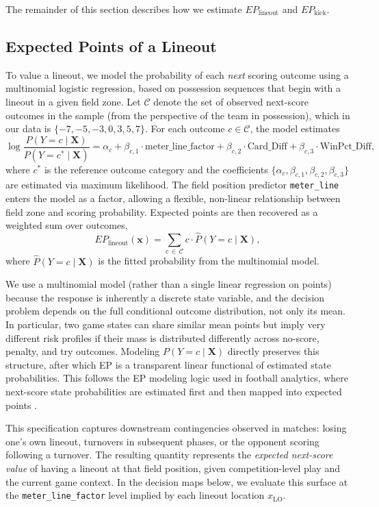 \documentclass[12pt]{article}
\begin{document}
The remainder of this section describes how we estimate $EP_{\text{lineout}}$ and $EP_{\text{kick}}$.


\subsection{Expected Points of a Lineout}
\label{sec:lineout}
To value a lineout, we model the probability of each \emph{next} scoring outcome using a multinomial logistic regression, based on possession sequences that begin with a lineout in a given field zone. Let $\mathcal{C}$ denote the set of observed next-score outcomes in the sample (from the perspective of the team in possession), which in our data is $\{-7, -5, -3, 0, 3, 5, 7\}$. For each outcome $c \in \mathcal{C}$, the model estimates
\[
\log \frac{P(Y = c \mid \mathbf{X})}{P(Y = c^* \mid \mathbf{X})}
  = \alpha_c + \beta_{c,1} \cdot \text{meter\_line\_factor}
  + \beta_{c,2} \cdot \text{Card\_Diff}
  + \beta_{c,3} \cdot \text{WinPct\_Diff},
\]
where $c^*$ is the reference outcome category and the coefficients $\{\alpha_c, \beta_{c,1}, \beta_{c,2}, \beta_{c,3}\}$ are estimated via maximum likelihood. The field position predictor \texttt{meter\_line} enters the model as a factor, allowing a flexible, non-linear relationship between field zone and scoring probability. Expected points are then recovered as a weighted sum over outcomes,
\[
EP_{\text{lineout}}(\mathbf{x}) = \sum_{c \,\in\, \mathcal{C}} c \cdot \hat{P}(Y = c \mid \mathbf{X}),
\]
where $\hat{P}(Y = c \mid \mathbf{X})$ is the fitted probability from the multinomial model.

We use a multinomial model (rather than a single linear regression on points) because the response is inherently a discrete state variable, and the decision problem depends on the full conditional outcome distribution, not only its mean. In particular, two game states can share similar mean points but imply very different risk profiles if their mass is distributed differently across no-score, penalty, and try outcomes. Modeling $P(Y=c\mid\mathbf{X})$ directly preserves this structure, after which EP is a transparent linear functional of estimated state probabilities. This follows the EP modeling logic used in football analytics, where next-score state probabilities are estimated first and then mapped into expected points \citep{YurkoVenturaHorowitz2018}.

This specification captures downstream contingencies observed in matches: losing one's own lineout, turnovers in subsequent phases, or the opponent scoring following a turnover. The resulting quantity represents the \emph{expected next-score value} of having a lineout at that field position, given competition-level play and the current game context. In the decision maps below, we evaluate this surface at the \texttt{meter\_line\_factor} level implied by each lineout location $x_{\text{LO}}$.
\end{document}
